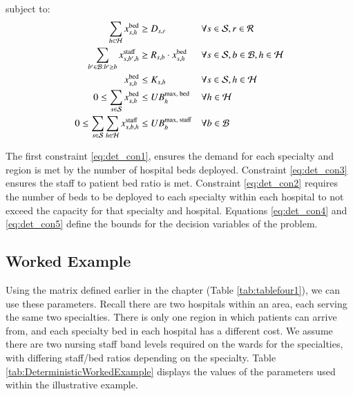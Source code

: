 \documentclass[../thesis.tex]{subfiles}
\begin{document}
subject to:
\begin{align}
    \sum_{h\in\mathcal{H}} x^\textnormal{bed}_{s,h}&\geq D_{s,r} & & \forall  s \in \mathcal{S}, r \in \mathcal{R} \label{eq:det_con1}\\
    \sum\limits_{b'\in\mathcal{B}: b'\geq b} x^\textnormal{staff}_{s,b',h} &\geq R_{s,b} \cdot x^\textnormal{bed}_{s,h} & & \forall s \in \mathcal{S}, b \in \mathcal{B}, h \in \mathcal{H}\label{eq:det_con3}\\
     {x_{s,h}^\textnormal{bed}} &\leq K_{s,h} & & \forall s \in \mathcal{S}, h \in \mathcal{H}\label{eq:det_con2}\\
   0 \leq \sum_{s\in\mathcal{S}}{x_{s,h}^\textnormal{bed}} &\leq {UB_h^\textnormal{max, bed}} & & \forall h \in \mathcal{H}\label{eq:det_con4}\\
    0 \leq \sum_{s\in\mathcal{S}}\sum_{h\in\mathcal{H}}{x_{s,b,h}^\textnormal{staff}} &\leq UB^\textnormal{max, staff}_{b}& & \forall b \in \mathcal{B} \label{eq:det_con5}
\end{align}

The first constraint \eqref{eq:det_con1}, ensures the demand for each specialty and region is met by the number of hospital beds deployed. Constraint \eqref{eq:det_con3} ensures the staff to patient bed ratio is met. Constraint \ref{eq:det_con2} requires the number of beds to be deployed to each specialty within each hospital to not exceed the capacity for that specialty and hospital. Equations \eqref{eq:det_con4} and \eqref{eq:det_con5} define the bounds for the decision variables of the problem.   

\subsection{Worked Example}
Using the matrix defined earlier in the chapter (Table \ref{tab:tablefour1}), we can use these parameters. Recall there are two hospitals within an area, each serving the same two specialties. There is only one region in which patients can arrive from, and each specialty bed in each hospital has a different cost. We assume there are two nursing staff band levels required on the wards for the specialties, with differing staff/bed ratios depending on the specialty. Table \ref{tab:DeterministicWorkedExample} displays the values of the parameters used within the illustrative example.
\end{document}
